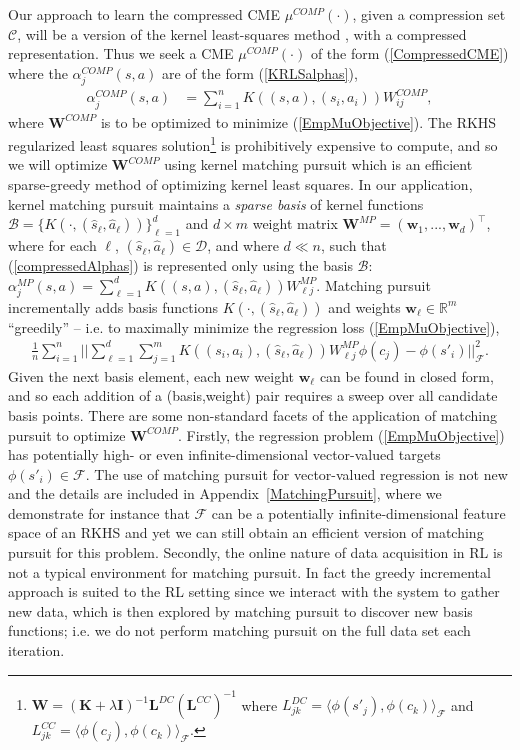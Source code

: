 \documentclass[letterpaper]{article}
\newcommand{\GrunewalderEmbeddingsRL}{GrunewalderEmbeddingsMDP}
\newcommand{\MallatMatchingPursuit}{DBLP:journals/tsp/MallatZ93}
\newcommand{\BengioKernelMP}{DBLP:journals/ml/VincentB02}
\newcommand{\LeverPoliciesInRKHS}{DBLP:conf/aistats/LeverS15}
\newcommand{\cD}{{\mathcal D}}
\newcommand{\cC}{{\mathcal C}}
\newcommand{\cB}{{\mathcal B}}
\newcommand{\cF}{{\mathcal F}}
\newcommand{\bL}{{\bm L}}
\newcommand{\bK}{{\bm K}}
\newcommand{\bW}{{\bm W}}
\newcommand{\bI}{{\bm I}}
\newcommand{\bw}{{\bm w}}
\newcommand{\R}{{\mathbb R}}
\newcommand{\lang}{\langle}
\newcommand{\rang}{\rangle}
\newcommand{\nn}{\nonumber}
\begin{document}
Our approach to learn the compressed CME $\mu^{COMP}(\cdot)$, given a compression set $\cC$, will be a version of the kernel least-squares method \citep{\GrunewalderEmbeddingsRL}, with a compressed representation. Thus we seek a CME $\mu^{COMP}(\cdot)$ of the form (\ref{CompressedCME}) where the $\alpha^{COMP}_j(s,a)$ are of the form (\ref{KRLSalphas}),
\begin{align}
\alpha_j^{COMP}(s,a) &=  \sum_{i=1}^n K((s,a),(s_i,a_i)) W^{COMP}_{ij}, \label{compressedAlphas}
\end{align}
where $\bW^{COMP}$ is to be optimized to minimize (\ref{EmpMuObjective}). The RKHS regularized least squares solution\footnote{$\bW = (\bK+\lambda\bI)^{-1}\bL^{DC}(\bL^{CC})^{-1}$ where $L_{jk}^{DC} = \lang \phi(s'_j) , \phi(c_k) \rang_{\cF}$ and $L_{jk}^{CC} = \lang \phi(c_j) , \phi(c_k) \rang_{\cF}$.} is prohibitively expensive to compute, and so we will optimize $\bW^{COMP}$ using  kernel matching pursuit \citep{\BengioKernelMP,\MallatMatchingPursuit} which is an efficient sparse-greedy method of optimizing kernel least squares. In our application, kernel matching pursuit maintains a \emph{sparse basis} of kernel functions $\cB = \{ K(\cdot,(\hat s_\ell,\hat a_\ell)) \}_{\ell=1}^d$ and $d\times m$ weight matrix $\bW^{MP} = (\bw_1,...,\bw_d)^\top$, where for each $\ell$, $(\hat s_\ell, \hat a_\ell)\in\cD$, and where $d\ll n$, such that (\ref{compressedAlphas}) is represented only using the basis $\cB$: $\alpha_j^{MP}(s,a)=  \sum_{\ell=1}^d K((s,a),(\hat s_\ell,\hat a_\ell)) W^{MP}_{\ell j}$. Matching pursuit incrementally adds basis functions $K(\cdot,(\hat s_\ell,\hat a_\ell))$ and weights $\bw_\ell\in\R^m$ ``greedily'' -- i.e. to maximally minimize the regression loss (\ref{EmpMuObjective}),
\begin{align}
\frac{1}{n}\sum_{i=1}^n ||\sum_{\ell=1}^d\sum_{j=1}^m K((s_i,a_i),(\hat s_\ell,\hat a_\ell)) W^{MP}_{\ell j}\phi(c_j) - \phi(s'_i) ||^2_\cF.\nn
\end{align}
Given the next basis element, each new weight $\bw_\ell$ can be found in closed form, and so each addition of a (basis,weight) pair requires a sweep over all candidate basis points. There are some non-standard facets of the application of matching pursuit to optimize $\bW^{COMP}$. Firstly, the regression problem (\ref{EmpMuObjective}) has potentially high- or even infinite-dimensional vector-valued targets $\phi(s'_i)\in\cF$. The use of matching pursuit for vector-valued regression is not new \citep[see e.g.][]{\LeverPoliciesInRKHS} and the details are included in Appendix~\ref{MatchingPursuit}, where we demonstrate for instance that $\cF$ can be a potentially infinite-dimensional feature space of an RKHS and yet we can still obtain an efficient version of matching pursuit for this problem. Secondly, the online nature of data acquisition in RL is not a typical environment for matching pursuit. In fact the greedy incremental approach is suited to the RL setting since we interact with the system to gather new data, which is then explored by matching pursuit to discover new basis functions; i.e. we do not perform matching pursuit on the full data set each iteration.
\end{document}

